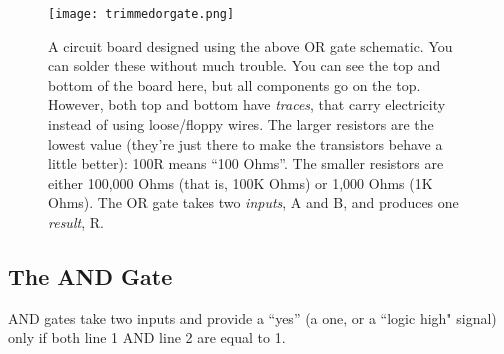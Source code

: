\begin{figure}[!hb]
\begin{center}
\texttt{[image: trimmedorgate.png]}
\caption{A circuit board designed using the above OR gate schematic. You can solder these without much trouble. You can see the top and bottom of the board here, but all components go on the top. However, both top and bottom have \emph{traces}, that carry electricity instead of using loose/floppy wires. The larger resistors are the lowest value (they're just there to make the transistors behave a little better): 100R means ``100 Ohms''. The smaller resistors are either 100,000 Ohms (that is, 100K Ohms) or 1,000 Ohms (1K Ohms). The OR gate takes two \emph{inputs}, A and B, and produces one \emph{result}, R.}
\label{fig:orgatepcbs}
\end{center}
\end{figure}





\clearpage
\newpage

\subsection*{The AND Gate}

AND gates take two inputs and provide a ``yes'' (a one, or a ``logic high" signal) only if both line 1 AND line 2 are equal to 1.

